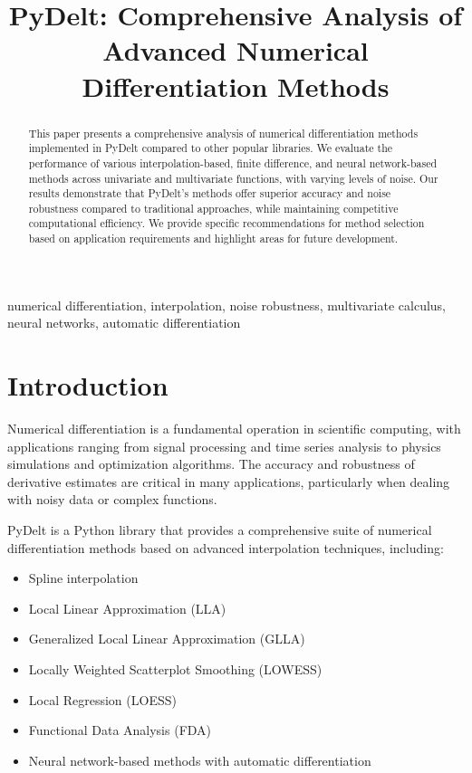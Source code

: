 \documentclass[conference]{IEEEtran}
\begin{document}
\title{PyDelt: Comprehensive Analysis of Advanced Numerical Differentiation Methods}

\author{
}

\maketitle

\begin{abstract}
This paper presents a comprehensive analysis of numerical differentiation methods implemented in PyDelt compared to other popular libraries. We evaluate the performance of various interpolation-based, finite difference, and neural network-based methods across univariate and multivariate functions, with varying levels of noise. Our results demonstrate that PyDelt's methods offer superior accuracy and noise robustness compared to traditional approaches, while maintaining competitive computational efficiency. We provide specific recommendations for method selection based on application requirements and highlight areas for future development.
\end{abstract}

\begin{IEEEkeywords}
numerical differentiation, interpolation, noise robustness, multivariate calculus, neural networks, automatic differentiation
\end{IEEEkeywords}

\section{Introduction}
Numerical differentiation is a fundamental operation in scientific computing, with applications ranging from signal processing and time series analysis to physics simulations and optimization algorithms. The accuracy and robustness of derivative estimates are critical in many applications, particularly when dealing with noisy data or complex functions.

PyDelt is a Python library that provides a comprehensive suite of numerical differentiation methods based on advanced interpolation techniques, including:

\begin{itemize}
\item Spline interpolation
\item Local Linear Approximation (LLA)
\item Generalized Local Linear Approximation (GLLA)
\item Locally Weighted Scatterplot Smoothing (LOWESS)
\item Local Regression (LOESS)
\item Functional Data Analysis (FDA)
\item Neural network-based methods with automatic differentiation
\end{itemize}
\end{document}

